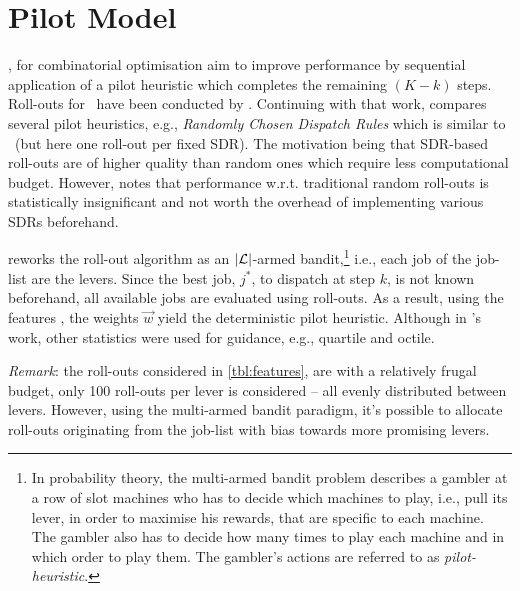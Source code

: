 
\chapter{Pilot Model}\label{ch:rollout}

\citep{Bertsekas97,Duin99}, for combinatorial optimisation aim to improve 
performance by sequential application of a pilot heuristic which completes the 
remaining $(K-k)$ steps. Roll-outs for \JSP\ have been conducted by 
\citet{Ru12}. 
Continuing with that work, \citet{Geirsson2012} compares several pilot 
heuristics, e.g., \emph{Randomly Chosen Dispatch Rules} which is similar 
to \phiSDRRelated\ (but here one roll-out per fixed SDR). 
The motivation being that SDR-based roll-outs are of higher quality than 
random ones which require less computational budget. 
However, \citeauthor{Geirsson2012} notes that performance w.r.t. traditional 
random roll-outs is statistically insignificant and not worth the overhead of 
implementing various SDRs beforehand. 

\citeauthor{Geirsson2012} reworks the roll-out algorithm as an 
$\lvert\mathcal{L}\rvert$-armed bandit,\footnote{In probability theory, the
    multi-armed bandit problem \citep{badit:book} describes a gambler at a row 
    of slot machines who has to decide which machines to play, i.e., pull its 
    lever, in  order to maximise his rewards, that are specific to each 
    machine. The gambler also has to decide how many times to play each machine 
    and in which order to play them. The gambler's actions are referred to as 
    \emph{pilot-heuristic}.} 
i.e., each job of the job-list are the levers. Since the best job, $j^*$, to 
dispatch at step $k$, is not known beforehand, all available jobs are 
evaluated using roll-outs. 
As a result, using the features \phiRNDRelated, the weights $\vec{w}$ yield the 
deterministic pilot heuristic. Although in \citeauthor{Geirsson2012}'s work, 
other statistics were used for guidance, e.g., quartile and octile. 

\pagebreak
\emph{Remark}: the roll-outs considered in \cref{tbl:features}, are with a 
relatively frugal budget, only 100 roll-outs per lever is considered -- all 
evenly distributed between levers. 
However, using the multi-armed bandit paradigm, it's possible to allocate 
roll-outs originating from the job-list with bias towards more promising levers.

